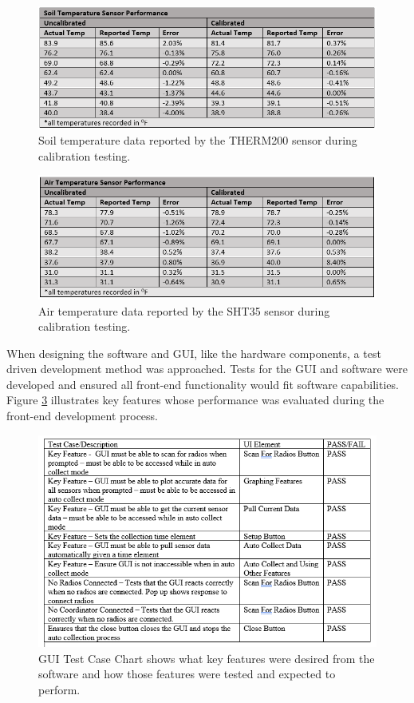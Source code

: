 \documentclass{report}
\begin{document}
\begin{figure}[H] %
    \centering
    \includegraphics{PNGs/SoilTempData.PNG}
    \caption{Soil temperature data reported by the THERM200 sensor during calibration testing.}
    \label{fig:SoilTemp}
\end{figure}

\begin{figure}[H] %
    \centering
    \includegraphics{PNGs/AirTempData.PNG}
    \caption{Air temperature data reported by the SHT35 sensor during calibration testing.}
    \label{fig:AirTemp}
\end{figure}

When designing the software and GUI, like the hardware components, a test driven development method was approached. Tests for the GUI and software were developed and ensured all front-end functionality would fit software capabilities. Figure \ref{fig:GUITest} illustrates key features whose performance was evaluated during the front-end development process.\\

\begin{figure}[H] %
    \centering
    \includegraphics{PNGs/GUITestCase.PNG}
    \caption{GUI Test Case Chart shows what key features were desired from the software and how those features were tested and expected to perform.}
    \label{fig:GUITest}
\end{figure}
\end{document}
